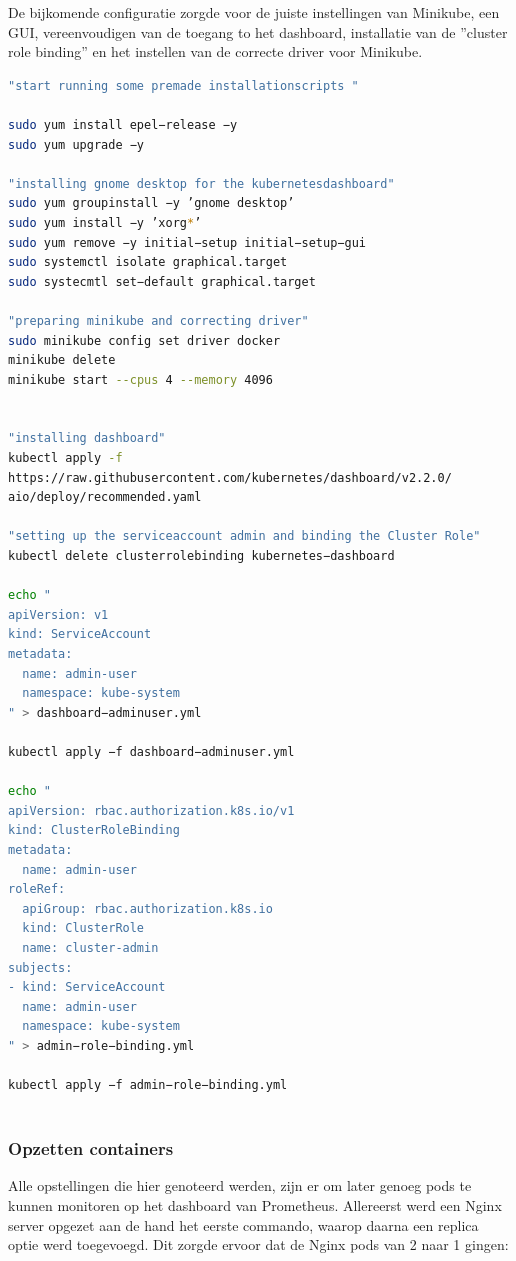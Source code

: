 De bijkomende configuratie zorgde voor de juiste instellingen van Minikube, een GUI, vereenvoudigen van de toegang to het dashboard, installatie van de ''cluster role binding'' en het instellen van de correcte driver voor Minikube.

\begin{lstlisting}[language=bash,caption={Extra configuratie}]
"start running some premade installationscripts "

sudo yum install epel−release −y
sudo yum upgrade −y

"installing gnome desktop for the kubernetesdashboard"
sudo yum groupinstall −y ’gnome desktop’
sudo yum install −y ’xorg*’
sudo yum remove −y initial−setup initial−setup−gui
sudo systemctl isolate graphical.target
sudo systecmtl set−default graphical.target

"preparing minikube and correcting driver"
sudo minikube config set driver docker
minikube delete
minikube start --cpus 4 --memory 4096


"installing dashboard"
kubectl apply -f
https://raw.githubusercontent.com/kubernetes/dashboard/v2.2.0/
aio/deploy/recommended.yaml

"setting up the serviceaccount admin and binding the Cluster Role"
kubectl delete clusterrolebinding kubernetes−dashboard

echo "
apiVersion: v1
kind: ServiceAccount
metadata:
  name: admin-user
  namespace: kube-system
" > dashboard−adminuser.yml

kubectl apply −f dashboard−adminuser.yml

echo "
apiVersion: rbac.authorization.k8s.io/v1
kind: ClusterRoleBinding
metadata:
  name: admin-user
roleRef:
  apiGroup: rbac.authorization.k8s.io
  kind: ClusterRole
  name: cluster-admin
subjects:
- kind: ServiceAccount
  name: admin-user
  namespace: kube-system
" > admin−role−binding.yml

kubectl apply −f admin−role−binding.yml
    
\end{lstlisting}

\subsubsection{Opzetten containers}

Alle opstellingen die hier genoteerd werden, zijn er om later genoeg pods te kunnen monitoren op het dashboard van Prometheus. Allereerst werd een Nginx server opgezet aan de hand het eerste commando, waarop daarna een replica optie werd toegevoegd. Dit zorgde ervoor dat de Nginx pods van 2 naar 1 gingen:

